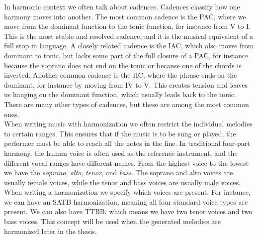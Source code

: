     In harmonic context we often talk about cadences. Cadences classify how one harmony moves into another. The most common cadence is the \ac{PAC}, where we move from the dominant function to the tonic function, for instance from V to I. This is the most stable and resolved cadence, and it is the musical equivalent of a full stop in language. A closely related cadence is the \ac{IAC}, which also moves from dominant to tonic, but lacks some part of the full closure of a \ac{PAC}, for instance because the soprano does not end on the tonic or because one of the chords is inverted. Another common cadence is the \ac{HC}, where the phrase ends on the dominant, for instance by moving from IV to V. This creates tension and leaves us hanging on the dominant function, which usually leads back to the tonic. There are many other types of cadences, but these are among the most common ones. \cite{benCadencesMusicTheory2013} \\

    When writing music with harmonization we often restrict the individual melodies to certain ranges. This ensures that if the music is to be sung or played, the performer must be able to reach all the notes in the line. In traditional four-part harmony, the human voice is often used as the reference instrument, and the different vocal ranges have different names. From the highest voice to the lowest we have the \textit{soprano}, \textit{alto}, \textit{tenor}, and \textit{bass}. The soprano and alto voices are usually female voices, while the tenor and bass voices are usually male voices.
    When writing a harmonization we specify which voices are present. For instance, we can have an SATB harmonization, meaning all four standard voice types are present. We can also have TTBB, which means we have two tenor voices and two bass voices. This concept will be used when the generated melodies are harmonized later in the thesis.

